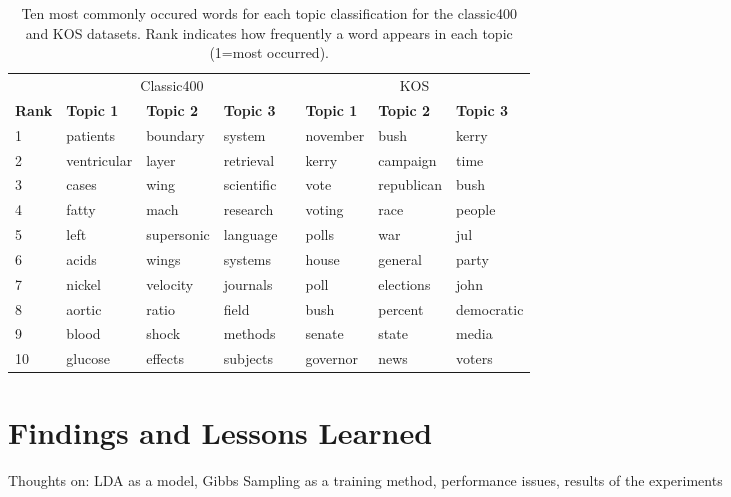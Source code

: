 \documentclass[10pt]{article}
\newcommand{\ra}[1]{\renewcommand{\arraystretch}{#1}}
\begin{document}
\begin{table}
	\centering
    \ra{1.2}
	\begin{tabular}{@{} l l l l c l l l @{}}
        \toprule
        & \multicolumn{3}{c}{Classic400} & \phantom{abc} & \multicolumn{3}{c}{KOS}\\
        \cmidrule{2-4} \cmidrule{6-8}
        \bf{Rank} & \bf{Topic 1} & \bf{Topic 2} & \bf{Topic 3} && \bf{Topic 1} & \bf{Topic 2} & \bf{Topic 3} \\
        \midrule
         1 & patients    & boundary   & system     && november & bush       & kerry \\
         2 & ventricular & layer      & retrieval  && kerry    & campaign   & time \\
         3 & cases       & wing       & scientific && vote     & republican & bush \\
         4 & fatty       & mach       & research   && voting   & race       & people \\
         5 & left        & supersonic & language   && polls    & war        & jul \\
         6 & acids       & wings      & systems    && house    & general    & party \\
         7 & nickel      & velocity   & journals   && poll     & elections  & john \\
         8 & aortic      & ratio      & field      && bush     & percent    & democratic \\
         9 & blood       & shock      & methods    && senate   & state      & media \\
        10 & glucose     & effects    & subjects   && governor & news       & voters \\
        \bottomrule
	\end{tabular}
	\caption{Ten most commonly occured words for each topic classification for the classic400 and KOS datasets. Rank indicates how frequently a word appears in each topic (1=most occurred).}
	\label{tab:common_classic400}
\end{table}



\section{Findings and Lessons Learned}
\label{sec:conclusion}

Thoughts on: LDA as a model, Gibbs Sampling as a training method, performance issues, results of the experiments




\end{document}
